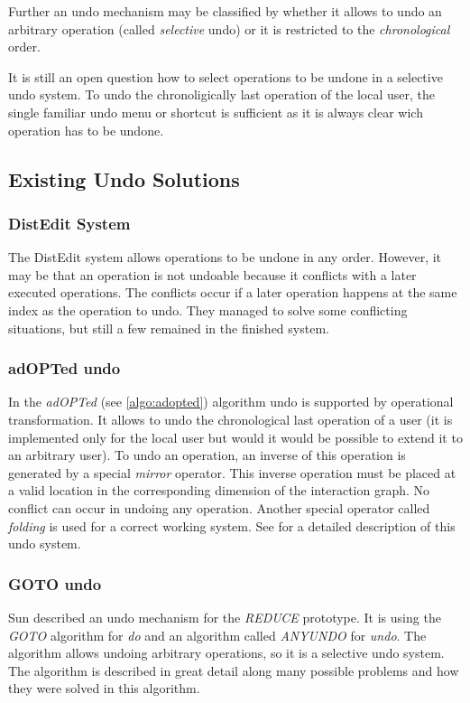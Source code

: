 Further an undo mechanism may be classified by whether it allows to undo an arbitrary operation (called \emph{selective} undo) or it is restricted to the \emph{chronological} order.

It is still an open question how to select operations to be undone in a selective undo system. To undo the chronoligically last operation of the local user, the single familiar undo menu or shortcut is sufficient as it is always clear wich operation has to be undone.


\subsection{Existing Undo Solutions}

\subsubsection{DistEdit System}
The DistEdit system \cite{prakash94} allows operations to be undone in any order. However, it may be that an operation is not undoable because it conflicts with a later executed operations. The conflicts occur if a later operation happens at the same index as the operation to undo. They managed to solve some conflicting situations, but still a few remained in the finished system.

\subsubsection{adOPTed undo}
In the \emph{adOPTed} (see \ref{algo:adopted}) algorithm undo is supported by operational transformation. It allows to undo the chronological last operation of a user (it is implemented only for the local user but would it would be possible to extend it to an arbitrary user). To undo an operation, an inverse of this operation is generated by a special \emph{mirror} operator. This inverse operation must be placed at a valid location in the corresponding dimension of the interaction graph. No conflict can occur in undoing any operation. Another special operator called \emph{folding} is used for a correct working system. See \cite{ressel99} for a detailed description of this undo system.

\subsubsection{GOTO undo}
Sun \cite{sun02b} described an undo mechanism for the \emph{REDUCE} prototype. It is using the \emph{GOTO} algorithm for \emph{do} and an algorithm called \emph{ANYUNDO} for \emph{undo}. The algorithm allows undoing arbitrary operations, so it is a selective undo system. The algorithm is described in great detail along many possible problems and how they were solved in this algorithm.

